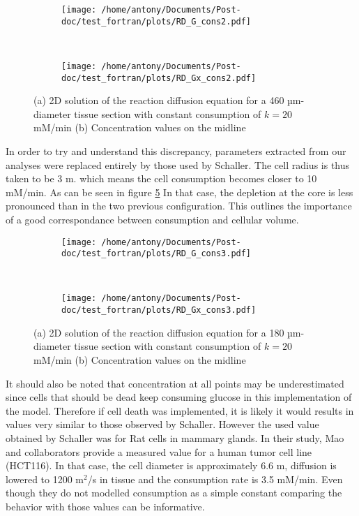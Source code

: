 \documentclass[11pt,a4paper]{article}
\begin{document}
\begin{figure}[ht!]
	\begin{subfigure}{0.45\textwidth}
	\centering
	\texttt{[image: /home/antony/Documents/Post-doc/test\_fortran/plots/RD\_G\_cons2.pdf]}
	\caption{ \label{RD_G_cons2}}
	\end{subfigure}
	~~
	\begin{subfigure}{0.45\textwidth}
	\texttt{[image: /home/antony/Documents/Post-doc/test\_fortran/plots/RD\_Gx\_cons2.pdf]}
		\caption{ \label{RD_Gx_cons2}}
	\end{subfigure}
	\caption{(a) 2D solution of the reaction diffusion equation for a 460 µm-diameter tissue section with constant consumption of $k = 20$ mM/min (b) Concentration values on the midline \label{RD_cons2}}
\end{figure}

In order to try and understand this discrepancy, parameters extracted from our analyses were replaced entirely by those used by Schaller. The cell radius is thus taken to be 3 \textmu m. which means the cell consumption becomes closer to 10 mM/min. As can be seen in figure \ref{RD_Gx_cons3}  In that case, the depletion at the core is less pronounced than in the two previous configuration. This outlines the importance of a good correspondance between consumption and cellular volume. 

\begin{figure}[ht!]
	\begin{subfigure}{0.45\textwidth}
	\centering
	\texttt{[image: /home/antony/Documents/Post-doc/test\_fortran/plots/RD\_G\_cons3.pdf]}
	\caption{ \label{RD_G_cons3}}
	\end{subfigure}
	~~
	\begin{subfigure}{0.45\textwidth}
	\texttt{[image: /home/antony/Documents/Post-doc/test\_fortran/plots/RD\_Gx\_cons3.pdf]}
		\caption{ \label{RD_Gx_cons3}}
	\end{subfigure}
	\caption{(a) 2D solution of the reaction diffusion equation for a 180 µm-diameter tissue section with constant consumption of $k = 20$ mM/min (b) Concentration values on the midline \label{RD_cons3}}
\end{figure}

It should also be noted that concentration at all points may be underestimated since cells that should be dead keep consuming glucose in this implementation of the model. Therefore if cell death was implemented, it is likely it would results in values very similar to those observed by Schaller. However the used value obtained by Schaller was for Rat cells in mammary glands. In their study, Mao and collaborators provide a measured  value for a human tumor cell line (HCT116). In that case, the cell diameter is approximately 6.6 \textmu m, diffusion is lowered to 1200 \textmu m$^2$/s in tissue and the consumption rate is 3.5 mM/min. Even though they do not modelled consumption as a simple constant comparing the behavior with those values can be informative.
\end{document}
